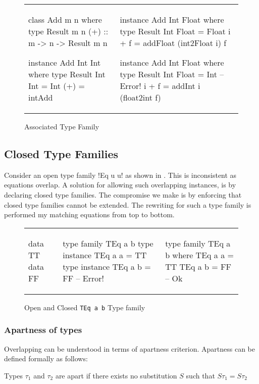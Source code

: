 \documentclass[format=sigplan,manuscript,review,screen, nonacm]{acmart}
\begin{document}
\begin{figure}[ht]
  \begin{tabular}{l l}
    \begin{code}
      class Add m n where
         type Result m n
         (+) :: m -> n -> Result m n

      instance Add Int Int where
         type Result Int Int = Int
         (+) = intAdd
    \end{code}&%
    \begin{code}
      instance Add Int Float where
         type Result Int Float = Float
         i + f = addFloat (int2Float i) f

      instance Add Int Float where
         type Result Int Float = Int -- Error!
         i + f = addInt i (float2int f)
    \end{code}
  \end{tabular}
  \caption{Associated Type Family}
  \label{fig:asso-tyfam}
\end{figure}

\subsection{Closed Type Families}
Consider an open type family !Eq u u! as shown in .
This is inconsistent as equations overlap. A solution for allowing such overlapping
instances, is by declaring closed type families. The compromise we make is by enforcing
that closed type families cannot be extended. The rewriting for such a type family
is performed my matching equations from top to bottom.

\begin{figure}[ht]
  \begin{tabular}{l l l}
    \begin{code}
      data TT
      data FF
    \end{code}&%
    \begin{code}
      type family TEq a b
      type instance TEq a a = TT
      type instance TEq a b = FF -- Error!
    \end{code}&%
    \begin{code}
      type family TEq a b where
          TEq a a = TT
          TEq a b = FF  -- Ok
    \end{code}
  \end{tabular}
  \caption{Open and Closed \texttt{TEq a b} Type family}
  \label{fig:eq-ty-fam}
\end{figure}


\subsubsection{Apartness of types}
Overlapping can be understood in terms of apartness criterion. Apartness can be defined formally as follows:
\begin{definition}[Apartness]\label{def:apartness}
  Types $\tau_1$  and $\tau_2$ are apart if there exists no substitution $S$ such that
  $S\tau_1 = S\tau_2$
\end{definition}
\end{document}
